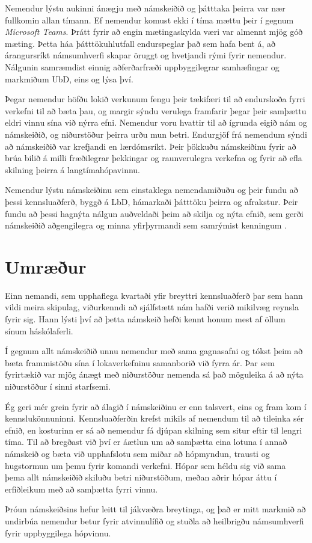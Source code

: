 \documentclass{kennsluakademia_conf}
\begin{document}
Nemendur lýstu aukinni ánægju með námskeiðið og þátttaka þeirra var nær fullkomin allan tímann. Ef nemendur komust ekki í tíma mættu þeir í gegnum \textit{Microsoft Teams}. Þrátt fyrir að engin mætingaskylda væri var almennt mjög góð mæting. Þetta háa þátttökuhlutfall endurspeglar það sem \cite{freeman2007sense} hafa bent á, að árangursríkt námsumhverfi skapar öruggt og hvetjandi rými fyrir nemendur. Nálgunin samræmdist einnig aðferðarfræði uppbyggilegrar samhæfingar og markmiðum UbD, eins og \cite{biggs_constructive, biggs_university} lýsa því.

Þegar nemendur höfðu lokið verkunum fengu þeir tækifæri til að endurskoða fyrri verkefni til að bæta þau, og margir sýndu verulega framfarir þegar þeir samþættu eldri vinnu sína við nýrra efni. Nemendur voru hvattir til að ígrunda eigið nám og námskeiðið, og niðurstöður þeirra urðu mun betri. Endurgjöf frá nemendum sýndi að námskeiðið var krefjandi en lærdómsríkt. Þeir þökkuðu námskeiðinu fyrir að brúa bilið á milli fræðilegrar þekkingar og raunverulegra verkefna og fyrir að efla skilning þeirra á langtímahópavinnu.

Nemendur lýstu námskeiðinu sem einstaklega nemendamiðuðu og þeir fundu að þessi kennsluaðferð, byggð á LbD, hámarkaði þátttöku þeirra og afrakstur. Þeir fundu að þessi hagnýta nálgun auðveldaði þeim að skilja og nýta efnið, sem gerði námskeiðið aðgengilegra og minna yfirþyrmandi sem samrýmist kenningum \cite{kolb1984experiential}.


\section{Umræður}

Einn nemandi, sem upphaflega kvartaði yfir breyttri kennsluaðferð þar sem hann vildi meira skipulag, viðurkenndi að sjálfstætt nám hafði verið mikilvæg reynsla fyrir sig. Hann lýsti því að þetta námskeið hefði kennt honum mest af öllum sínum háskólaferli.

Í gegnum allt námskeiðið unnu nemendur með sama gagnasafni og tókst þeim að bæta frammistöðu sína í lokaverkefninu samanborið við fyrra ár. Þar sem fyrirtækið var mjög ánægt með niðurstöður nemenda sá það möguleika á að nýta niðurstöður í sinni starfsemi. 

Ég geri mér grein fyrir að álagið í námskeiðinu er enn talsvert, eins og fram kom í kennslukönnuninni. Kennsluaðferðin krefst mikils af nemendum til að tileinka sér efnið, en kosturinn er sá að nemendur fá djúpan skilning sem situr eftir til lengri tíma.
Til að bregðast við því er áætlun um að samþætta eina lotuna í annað námskeið og bæta við upphafslotu sem miðar að hópmyndun, trausti og hugstormun um þemu fyrir komandi verkefni. Hópar sem héldu sig við sama þema allt námskeiðið skiluðu betri niðurstöðum, meðan aðrir hópar áttu í erfiðleikum með að samþætta fyrri vinnu.

Þróun námskeiðsins hefur leitt til jákvæðra breytinga, og það er mitt markmið að undirbúa nemendur betur fyrir atvinnulífið og stuðla að heilbrigðu námsumhverfi fyrir uppbyggilega hópvinnu.

  
  
\end{document}
